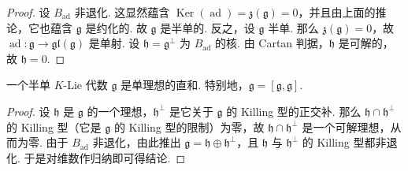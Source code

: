 \begin{numpara}
\begin{proof}
设 $B_{\mathrm{ad}}$ 非退化. 这显然蕴含 $\operatorname{Ker}(\operatorname{ad})=\mathfrak z(\mathfrak g)=0$，并且由上面的推论，它也蕴含 $\mathfrak g$ 是约化的. 故 $\mathfrak g$ 是半单的.
反之，设 $\mathfrak g$ 半单. 那么 $\mathfrak z(\mathfrak g)=0$，故 $\operatorname{ad}:\mathfrak g\longrightarrow\mathfrak{gl}(\mathfrak g)$ 是单射. 设 $\mathfrak h=\mathfrak g^{\perp}$ 为 $B_{\mathrm{ad}}$ 的核. 由 Cartan 判据，$\mathfrak h$ 是可解的，故 $\mathfrak h=0$.
\end{proof}
\begin{theorem*}
一个半单 $K$-Lie 代数 $\mathfrak g$ 是单理想的直和. 特别地，$\mathfrak g=[\mathfrak g,\mathfrak g]$.
\end{theorem*}
\begin{proof}
设 $\mathfrak h$ 是 $\mathfrak g$ 的一个理想，$\mathfrak h^{\perp}$ 是它关于 $\mathfrak g$ 的 Killing 型的正交补. 那么 $\mathfrak h\cap\mathfrak h^{\perp}$ 的 Killing 型（它是 $\mathfrak g$ 的 Killing 型的限制）为零，故 $\mathfrak h\cap\mathfrak h^{\perp}$ 是一个可解理想，从而为零. 由于 $B_{\mathrm{ad}}$ 非退化，由此推出 $\mathfrak g=\mathfrak h\oplus\mathfrak h^{\perp}$，且 $\mathfrak h$ 与 $\mathfrak h^{\perp}$ 的 Killing 型都非退化. 于是对维数作归纳即可得结论.
\end{proof}
\end{numpara}
